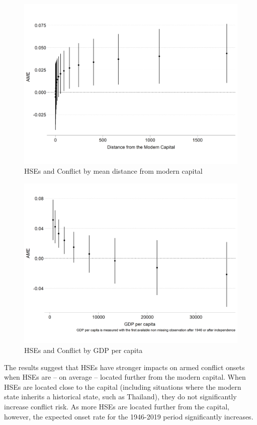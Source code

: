 \begin{figure}[!htb] \includegraphics[width=1\textwidth]{img/dist_interaction.png}
\caption{HSEs and Conflict by mean distance from modern capital} \label{Fig:
Int_Dist} \end{figure}

\begin{figure}[!htb] \includegraphics[width=1\textwidth]{img/gdp_interaction.png}
\caption{HSEs and Conflict by GDP per capita} \label{Fig: Int_GDP} \end{figure}


The results suggest that HSEs have stronger impacts on armed conflict onsets
when HSEs are -- on average -- located further from the modern capital. When HSEs are located close to the capital (including situations where the modern
state inherits a historical state, such as Thailand), they do not
significantly increase conflict risk. As more HSEs are located further from the capital, however, the expected
onset rate for the 1946-2019 period significantly increases. 


